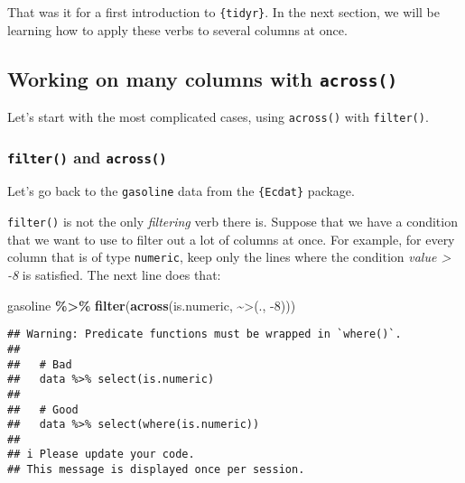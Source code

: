 \documentclass[
]{article}
\newenvironment{Shaded}{\begin{snugshade}}{\end{snugshade}}
\newcommand{\DataTypeTok}[1]{\textcolor[rgb]{0.13,0.29,0.53}{#1}}
\newcommand{\DecValTok}[1]{\textcolor[rgb]{0.00,0.00,0.81}{#1}}
\newcommand{\KeywordTok}[1]{\textcolor[rgb]{0.13,0.29,0.53}{\textbf{#1}}}
\newcommand{\NormalTok}[1]{#1}
\newcommand{\OperatorTok}[1]{\textcolor[rgb]{0.81,0.36,0.00}{\textbf{#1}}}
\newcommand{\StringTok}[1]{\textcolor[rgb]{0.31,0.60,0.02}{#1}}
\begin{document}
That was it for a first introduction to \texttt{\{tidyr\}}. In the next section, we will be learning
how to apply these verbs to several columns at once.

\hypertarget{working-on-many-columns-with-across}{%
\subsection{\texorpdfstring{Working on many columns with \texttt{across()}}{Working on many columns with across()}}\label{working-on-many-columns-with-across}}

Let's start with the most complicated cases, using \texttt{across()} with \texttt{filter()}.

\hypertarget{filter-and-across}{%
\subsubsection{\texorpdfstring{\texttt{filter()} and \texttt{across()}}{filter() and across()}}\label{filter-and-across}}

Let's go back to the \texttt{gasoline} data from the \texttt{\{Ecdat\}} package.

\texttt{filter()} is not the only \emph{filtering} verb there is. Suppose that we have a condition that we want
to use to filter out a lot of columns at once. For example, for every column that is of type
\texttt{numeric}, keep only the lines where the condition \emph{value \textgreater{} -8} is satisfied. The next line does
that:

\begin{Shaded}
\begin{Highlighting}[]
\NormalTok{gasoline }\OperatorTok{\%\textgreater{}\%}
\StringTok{  }\KeywordTok{filter}\NormalTok{(}\KeywordTok{across}\NormalTok{(is.numeric, }\OperatorTok{\textasciitilde{}}\StringTok{\textasciigrave{}}\DataTypeTok{\textgreater{}}\StringTok{\textasciigrave{}}\NormalTok{(., }\DecValTok{{-}8}\NormalTok{)))}
\end{Highlighting}
\end{Shaded}

\begin{verbatim}
## Warning: Predicate functions must be wrapped in `where()`.
## 
##   # Bad
##   data %>% select(is.numeric)
## 
##   # Good
##   data %>% select(where(is.numeric))
## 
## i Please update your code.
## This message is displayed once per session.
\end{verbatim}
\end{document}
